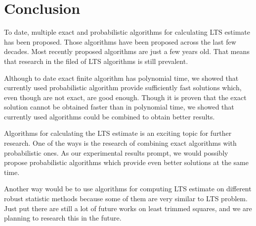 
\chapter{Conclusion}
To date, multiple exact and probabilistic algorithms for calculating LTS estimate has been proposed.
Those algorithms have been proposed across the last few decades. Most recently proposed algorithms are just a few years old. That means that research in the filed of LTS algorithms is still prevalent.

Although to date exact finite algorithm has polynomial time, we showed that currently used probabilistic algorithm provide sufficiently fast solutions which, even though are not exact, are good enough. Though it is proven that the exact solution cannot be obtained faster than in polynomial time, we showed that currently used algorithms could be combined to obtain better results. 


Algorithms for calculating the LTS estimate is an exciting topic for further research. One of the ways is the research of combining exact algorithms with probabilistic ones. As our experimental results prompt, we would possibly propose probabilistic algorithms which provide even better solutions at the same time.

Another way would be to use algorithms for computing LTS estimate on different robust statistic methods because some of them are very similar to LTS problem. Just put there are still a lot of future works on least trimmed squares, and we are planning to research this in the future.
